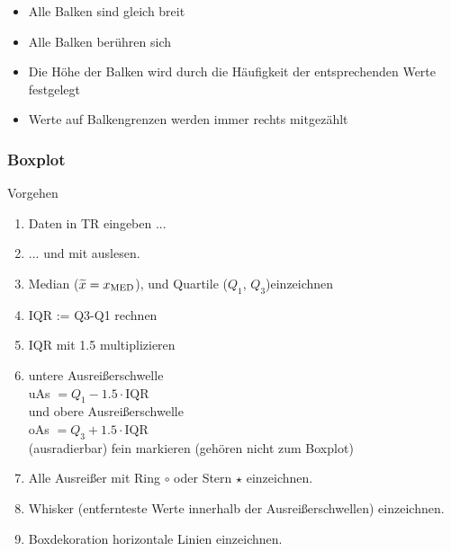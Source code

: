 \begin{multicols}{2}
\begin{itemize}
\item Alle Balken sind gleich breit
\item Alle Balken berühren sich
\item Die Höhe der Balken wird durch die Häufigkeit der entsprechenden
Werte festgelegt
\item Werte auf Balkengrenzen werden immer rechts mitgezählt
\end{itemize}


\subsubsection*{Boxplot}
Vorgehen
\begin{enumerate}
\item Daten in TR eingeben ...
\item ... und mit   auslesen.
\item {\color{orange} Median ($\widetilde{x} = x_{\textrm{MED}}$)},
und Quartile ({\color{blue}$Q_1$}, {\color{green}$Q_3$})einzeichnen
\item IQR := {\color{green}Q3}-{\color{blue}Q1} rechnen
\item IQR mit 1.5 multiplizieren
\item {\color{red} untere Ausreißerschwelle\\ uAs} $ = Q_1 -
1.5\cdot{}\textrm{IQR}$\\ und {\color{red} obere Ausreißerschwelle\\ oAs} $=Q_3 + 1.5\cdot{}\textrm{IQR}$\\ (ausradierbar) fein markieren (gehören nicht zum Boxplot)
\item Alle Ausreißer mit Ring $\circ$ oder Stern $\star$ einzeichnen.
\item Whisker (entfernteste Werte innerhalb der Ausreißerschwellen)
einzeichnen.
\item Boxdekoration horizontale Linien einzeichnen.
\end{enumerate}

\end{multicols}
